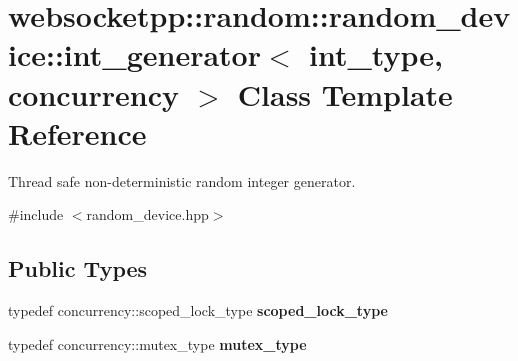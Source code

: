 \hypertarget{classwebsocketpp_1_1random_1_1random__device_1_1int__generator}{}\section{websocketpp\+:\+:random\+:\+:random\+\_\+device\+:\+:int\+\_\+generator$<$ int\+\_\+type, concurrency $>$ Class Template Reference}
\label{classwebsocketpp_1_1random_1_1random__device_1_1int__generator}


Thread safe non-\/deterministic random integer generator.  




{\ttfamily \#include $<$random\+\_\+device.\+hpp$>$}

\subsection*{Public Types}
\begin{DoxyCompactItemize}
\item 
typedef concurrency\+::scoped\+\_\+lock\+\_\+type {\bfseries scoped\+\_\+lock\+\_\+type}\hypertarget{classwebsocketpp_1_1random_1_1random__device_1_1int__generator_a7702456f8c753025bb52db190bfa04b3}{}\label{classwebsocketpp_1_1random_1_1random__device_1_1int__generator_a7702456f8c753025bb52db190bfa04b3}

\item 
typedef concurrency\+::mutex\+\_\+type {\bfseries mutex\+\_\+type}\hypertarget{classwebsocketpp_1_1random_1_1random__device_1_1int__generator_a76479f1088f245508e7efce66b3ab51c}{}\label{classwebsocketpp_1_1random_1_1random__device_1_1int__generator_a76479f1088f245508e7efce66b3ab51c}

\end{DoxyCompactItemize}
